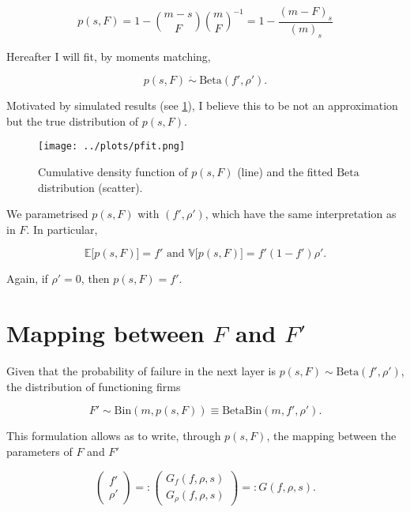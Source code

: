 \documentclass[american, abstract=on]{scrartcl}
\theoremstyle{plain}
\newcommand{\E}{\mathbb{E}}
\newcommand{\V}{\mathbb{V}}
\newcommand{\Beta}{\text{Beta}}
\newcommand{\Bin}{\text{Bin}}
\begin{document}
\begin{equation}
    p(s, F) = 1 - \binom{m - s}{F} \binom{m}{F}^{-1} = 1 - \frac{(m - F)_s}{(m)_s}
\end{equation}

Hereafter I will fit, by moments matching,

\begin{equation}
    p(s, F) \ \dot{\sim} \ \Beta(f', \rho').
\end{equation}

Motivated by simulated results (see \ref{fig:pfit}), I believe this to be not an approximation but the true distribution of $p(s, F)$. 

\begin{figure}[H]
    \centering
    \texttt{[image: ../plots/pfit.png]}
    \caption{Cumulative density function of $p(s, F)$ (line) and the fitted $\Beta$ distribution (scatter).}
    \label{fig:pfit}
\end{figure}

We parametrised $p(s, F)$ with $(f', \rho')$, which have the same interpretation as in $F$. In particular,

\begin{equation}
    \E\big[p(s, F)\big] = f' \text{ and } \V\big[p(s, F)\big] = f' (1 - f')\rho'.
\end{equation}

Again, if $\rho' = 0$, then $p(s, F) = f'$.

\section{Mapping between $F$ and $F'$}

Given that the probability of failure in the next layer is $p(s, F) \sim \Beta(f', \rho')$, the distribution of functioning firms 

\begin{equation}
    F' \sim \Bin(m, p(s, F)) \equiv \Beta\Bin(m, f', \rho').
\end{equation}

This formulation allows as to write, through $p(s, F)$, the mapping between the parameters of $F$ and $F'$

\begin{equation}
    \begin{pmatrix}
        f' \\ \rho'
    \end{pmatrix} =: \begin{pmatrix}
        G_f(f, \rho, s) \\ G_\rho(f, \rho, s)
    \end{pmatrix} =: G(f, \rho, s).
\end{equation}
\end{document}
